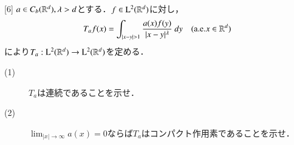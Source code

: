 \newpage
	\begin{itembox}[l]{[6]}
		$a \in C_b (\mathbb{R}^d), \lambda > d$とする．$f \in \mathrm{L}^2(\mathbb{R}^d)$に対し，
		\begin{align}
			T_a f(x) = \int_{|x - y| > 1} \frac{a(x)f(y)}{|x-y|^\lambda}\ dy
			\quad (\mbox{a.e.}x \in \mathbb{R}^d)
			\label{eq:report_6_0}
		\end{align}
		により$T_a:\mathrm{L}^2(\mathbb{R}^d) \rightarrow \mathrm{L}^2(\mathbb{R}^d)$を定める．
		\begin{description}
			\item[(1)] $T_a$は連続であることを示せ．
			\item[(2)] $\lim_{|x| \to \infty} a(x) = 0$ならば$T_a$はコンパクト作用素であることを示せ．
		\end{description}
	\end{itembox}
	

